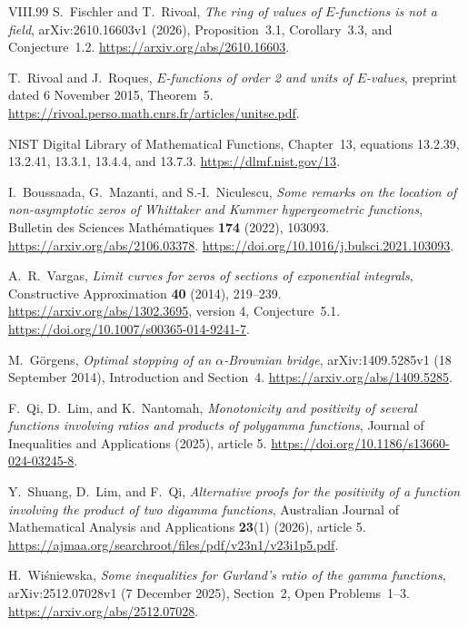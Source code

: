 \documentclass[11pt,a4paper]{article}
\theoremstyle{definition}
\theoremstyle{remark}
\numberwithin{equation}{section}
\begin{document}
\begin{thebibliography}{VIII.99}
S.~Fischler and T.~Rivoal, \emph{The ring of values of $E$-functions
is not a field}, arXiv:2610.16603v1 (2026), Proposition~3.1,
Corollary~3.3, and Conjecture~1.2.
\url{https://arxiv.org/abs/2610.16603}.

T.~Rivoal and J.~Roques, \emph{$E$-functions of order 2 and units of
$E$-values}, preprint dated 6 November 2015, Theorem~5.
\url{https://rivoal.perso.math.cnrs.fr/articles/unitse.pdf}.

NIST Digital Library of Mathematical Functions, Chapter~13,
equations 13.2.39, 13.2.41, 13.3.1, 13.4.4, and 13.7.3.
\url{https://dlmf.nist.gov/13}.

I.~Boussaada, G.~Mazanti, and S.-I.~Niculescu,
\emph{Some remarks on the location of non-asymptotic zeros of
Whittaker and Kummer hypergeometric functions}, Bulletin des Sciences
Math\'ematiques \textbf{174} (2022), 103093.
\url{https://arxiv.org/abs/2106.03378}.
\url{https://doi.org/10.1016/j.bulsci.2021.103093}.

A.~R.~Vargas, \emph{Limit curves for zeros of sections of exponential
integrals}, Constructive Approximation \textbf{40} (2014), 219--239.
\url{https://arxiv.org/abs/1302.3695}, version 4, Conjecture~5.1.
\url{https://doi.org/10.1007/s00365-014-9241-7}.

M.~G\"orgens, \emph{Optimal stopping of an $\alpha$-Brownian bridge},
arXiv:1409.5285v1 (18 September 2014), Introduction and Section~4.
\url{https://arxiv.org/abs/1409.5285}.

F.~Qi, D.~Lim, and K.~Nantomah, \emph{Monotonicity and positivity of
several functions involving ratios and products of polygamma functions},
Journal of Inequalities and Applications (2025), article 5.
\url{https://doi.org/10.1186/s13660-024-03245-8}.

Y.~Shuang, D.~Lim, and F.~Qi, \emph{Alternative proofs for the
positivity of a function involving the product of two digamma functions},
Australian Journal of Mathematical Analysis and Applications
\textbf{23}(1) (2026), article 5.
\url{https://ajmaa.org/searchroot/files/pdf/v23n1/v23i1p5.pdf}.

H.~Wi\'sniewska, \emph{Some inequalities for Gurland's ratio of the
gamma functions}, arXiv:2512.07028v1 (7 December 2025),
Section~2, Open Problems~1--3.
\url{https://arxiv.org/abs/2512.07028}.


\end{thebibliography}
\end{document}
